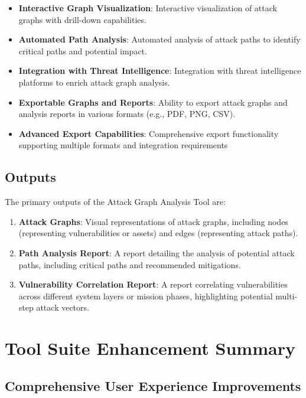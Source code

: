 \documentclass[binding=0.6cm]{sapthesis}
\begin{document}
\begin{itemize}
    \item \textbf{Interactive Graph Visualization}: Interactive visualization of attack graphs with drill-down capabilities.
    \item \textbf{Automated Path Analysis}: Automated analysis of attack paths to identify critical paths and potential impact.
    \item \textbf{Integration with Threat Intelligence}: Integration with threat intelligence platforms to enrich attack graph analysis.
    \item \textbf{Exportable Graphs and Reports}: Ability to export attack graphs and analysis reports in various formats (e.g., PDF, PNG, CSV).
    \item \textbf{Advanced Export Capabilities}: Comprehensive export functionality supporting multiple formats and integration requirements
\end{itemize}

\subsection{Outputs}

The primary outputs of the Attack Graph Analysis Tool are:

\begin{enumerate}
    \item \textbf{Attack Graphs}: Visual representations of attack graphs, including nodes (representing vulnerabilities or assets) and edges (representing attack paths).
    \item \textbf{Path Analysis Report}: A report detailing the analysis of potential attack paths, including critical paths and recommended mitigations.
    \item \textbf{Vulnerability Correlation Report}: A report correlating vulnerabilities across different system layers or mission phases, highlighting potential multi-step attack vectors.
\end{enumerate}

\section{Tool Suite Enhancement Summary}

\subsection{Comprehensive User Experience Improvements}
\end{document}
